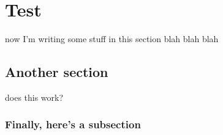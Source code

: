 \documentclass[12pt]{article}
\begin{document}
	
\section{Test}
now I'm writing some stuff in this section blah blah blah

\subsection{Another section}
does this work?

\subsubsection{Finally, here's a subsection}
	
\end{document}
